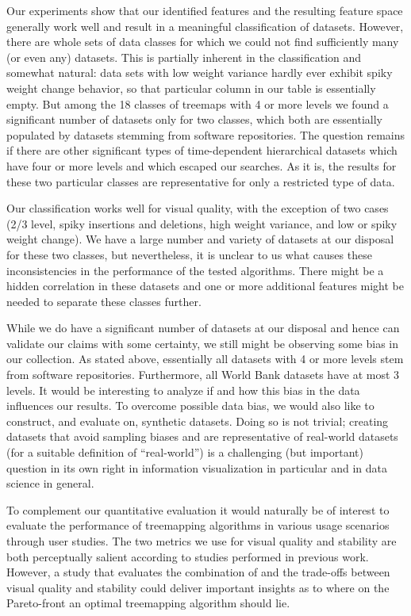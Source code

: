  Our experiments show that our identified features and the resulting feature space generally work well and result in a meaningful classification of datasets. However, there are whole sets of data classes for which we could not find sufficiently many (or even any) datasets. This is partially inherent in the classification and somewhat natural: data sets with low weight variance hardly ever exhibit spiky weight change behavior, so that particular column in our table is essentially empty. But among the 18 classes of treemaps with 4 or more levels we found a significant number of datasets only for two classes, which both are essentially populated by datasets stemming from software repositories. The question remains if there are other significant types of time-dependent hierarchical datasets which have four or more levels and which escaped our searches. As it is, the results for these two particular classes are representative for only a restricted type of data.

Our classification works well for visual quality, with the exception of two cases (2/3 level, spiky insertions and deletions, high weight variance, and low or spiky weight change). We have a large number and variety of datasets at our disposal for these two classes, but nevertheless, it is unclear to us what causes these inconsistencies in the performance of the tested algorithms. There might be a hidden correlation in these datasets and one or more additional features might be needed to separate these classes further.

While we do have a significant number of datasets at our disposal and hence can validate our claims with some certainty, we still might be observing some bias in our collection. As stated above, essentially all datasets with 4 or more levels stem from software repositories. Furthermore, all World Bank datasets have at most 3 levels. It would be interesting to analyze if and how this bias in the data influences our results.
To overcome possible data bias, we would also like to construct, and evaluate on, synthetic datasets. Doing so is not trivial; creating datasets that avoid sampling biases and are representative of real-world datasets (for a suitable definition of ``real-world'') is a challenging (but important) question in its own right in information visualization in particular and in data science in general.

To complement our quantitative evaluation it would naturally be of interest to evaluate the performance of treemapping algorithms in various usage scenarios through user studies. The two metrics we use for visual quality and stability are both perceptually salient according to studies performed in previous work. However, a study that evaluates the combination of and the trade-offs between visual quality and stability could deliver important insights as to where on the Pareto-front an optimal treemapping algorithm should lie.

